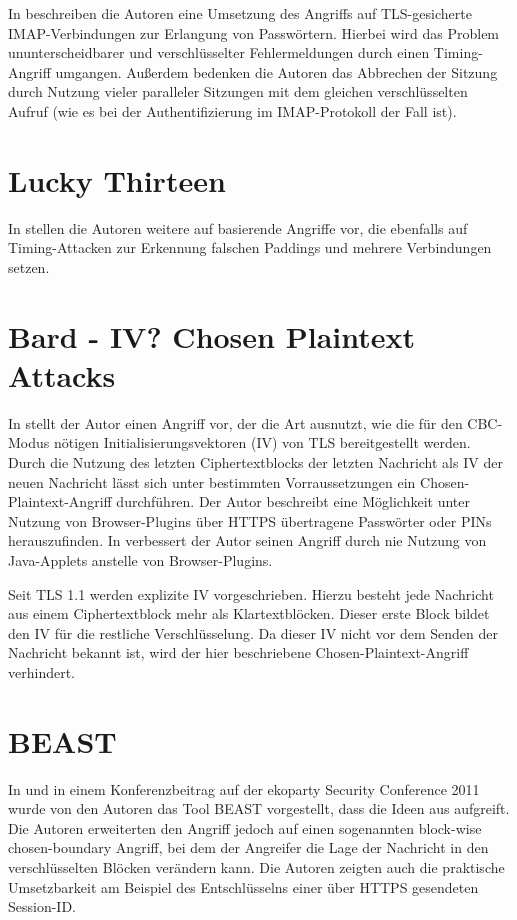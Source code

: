 \documentclass[
    12pt,
    headings=small,
    parskip=half,           %
    bibliography=totoc,
    numbers=noenddot,       %
    open=any,               %
    ]{scrreprt}
\begin{document}
In \cite{canvel03} beschreiben die Autoren eine Umsetzung des Angriffs auf TLS-gesicherte IMAP-Verbindungen zur Erlangung von Passwörtern. Hierbei wird das Problem ununterscheidbarer und verschlüsselter Fehlermeldungen durch einen Timing-Angriff umgangen. Außerdem bedenken die Autoren das Abbrechen der Sitzung durch Nutzung vieler paralleler Sitzungen mit dem gleichen verschlüsselten Aufruf (wie es bei der Authentifizierung im IMAP-Protokoll der Fall ist).


\section{Lucky Thirteen}

In \cite{paterson13} stellen die Autoren weitere auf \cite{vaudenay02} basierende Angriffe vor, die ebenfalls auf Timing-Attacken zur Erkennung falschen Paddings und mehrere Verbindungen setzen.

\section{Bard - IV? Chosen Plaintext Attacks}

In \cite{bard04} stellt der Autor einen Angriff vor, der die Art ausnutzt, wie die für den CBC-Modus nötigen Initialisierungsvektoren (IV) von TLS bereitgestellt werden. Durch die Nutzung des letzten Ciphertextblocks der letzten Nachricht als IV der neuen Nachricht lässt sich unter bestimmten Vorraussetzungen ein Chosen-Plaintext-Angriff durchführen. Der Autor beschreibt eine Möglichkeit unter Nutzung von Browser-Plugins über HTTPS übertragene Passwörter oder PINs herauszufinden. In \cite{bard06} verbessert der Autor seinen Angriff durch nie Nutzung von Java-Applets anstelle von Browser-Plugins.

Seit TLS 1.1 werden explizite IV vorgeschrieben. Hierzu besteht jede Nachricht aus einem Ciphertextblock mehr als Klartextblöcken. Dieser erste Block bildet den IV für die restliche Verschlüsselung. Da dieser IV nicht vor dem Senden der Nachricht bekannt ist, wird der hier beschriebene Chosen-Plaintext-Angriff verhindert.

\section{BEAST}

In \cite{duong11} und in einem Konferenzbeitrag auf der ekoparty Security Conference 2011 wurde von den Autoren das Tool BEAST vorgestellt, dass die Ideen aus \cite{bard04} aufgreift. Die Autoren erweiterten den Angriff jedoch auf einen sogenannten block-wise chosen-boundary Angriff, bei dem der Angreifer die Lage der Nachricht in den verschlüsselten Blöcken verändern kann. Die Autoren zeigten auch die praktische Umsetzbarkeit am Beispiel des Entschlüsselns einer über HTTPS gesendeten Session-ID.
\end{document}
